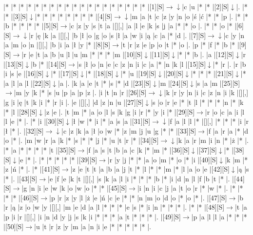 \documentclass[11pt]{article}
\newcommand\drarr{$\rightarrow \!\!\!\!\! \downarrow$}
\newcommand\rarr{$\rightarrow$}
\newcommand\darr{$\downarrow$}
\begin{document}
\noindent\begin{Puzzle}{24}{23}|*	|*	|*	|*	|*	|*	|*	|*	|*	|*	|*	|*	|*	|*	|*	|*	|*	|*	|*	|[1][S]\drarr	|c	|u	|*	|*	|[2][S]\darr	|.
|*	|*	|[3][S]\darr	|*	|*	|*	|*	|*	|*	|*	|*	|[4][S]\drarr	|m	|a	|t	|c	|z	|y	|n	|o	|ś	|ć	|*	|*	|p	|.
|*	|*	|b	|*	|*	|*	|*	|[5][S]\rarr	|c	|z	|y	|s	|t	|a	|[][,]{ }	|a	|l	|e	|k	|s	|j	|a	|*	|*	|o	|.
|*	|*	|o	|*	|[6][S]\drarr	|r	|ę	|k	|a	|[][,]{ }	|b	|ł	|o	|g	|o	|s	|ł	|a	|w	|i	|ą	|c	|a	|*	|d	|.
|[7][S]\drarr	|c	|y	|n	|a	|m	|o	|n	|[][,]{ }	|b	|i	|a	|ł	|y	|*	|[8][S]\rarr	|t	|r	|z	|e	|p	|o	|t	|*	|o	|.
|p	|*	|f	|*	|b	|*	|[9][S]\rarr	|r	|e	|t	|a	|b	|u	|l	|u	|m	|*	|*	|*	|m	|[10][S]\darr	|[11][S]\darr	|*	|*	|b	|.
|a	|[12][S]\darr	|r	|[13][S]\darr	|b	|*	|[14][S]\rarr	|s	|ł	|o	|n	|e	|c	|z	|n	|i	|c	|a	|*	|n	|k	|l	|[15][S]\darr	|*	|r	|.
|r	|b	|i	|s	|e	|[16][S]\darr	|*	|[17][S]\darr	|*	|[18][S]\darr	|*	|u	|[19][S]\darr	|[20][S]\darr	|*	|*	|*	|[21][S]\darr	|*	|a	|l	|a	|l	|[22][S]\darr	|a	|.
|k	|a	|e	|t	|*	|s	|*	|d	|[23][S]\darr	|m	|[24][S]\darr	|s	|a	|m	|[25][S]\rarr	|m	|y	|k	|*	|s	|u	|p	|a	|p	|z	|.
|i	|t	|n	|r	|[26][S]\drarr	|k	|r	|y	|n	|i	|c	|z	|n	|i	|k	|[][,]{ }	|g	|i	|ę	|t	|k	|i	|*	|r	|i	|.
|e	|[][,]{ }	|d	|z	|n	|u	|[27][S]\darr	|s	|o	|r	|e	|*	|t	|l	|*	|*	|*	|n	|*	|k	|*	|l	|[28][S]\darr	|z	|e	|.
|t	|m	|*	|a	|o	|l	|s	|k	|g	|i	|r	|*	|y	|i	|*	|[29][S]\rarr	|r	|o	|c	|a	|i	|l	|l	|e	|*	|.
|*	|i	|[30][S]\darr	|ł	|w	|*	|i	|*	|a	|s	|a	|[31][S]\drarr	|f	|a	|l	|l	|*	|[][,]{ }	|*	|*	|*	|i	|r	|ł	|*	|.
|[32][S]\drarr	|c	|z	|k	|a	|ł	|o	|w	|*	|z	|m	|j	|u	|g	|*	|*	|[33][S]\rarr	|f	|a	|r	|a	|*	|d	|o	|*	|.
|m	|w	|r	|a	|k	|*	|s	|*	|*	|j	|*	|u	|t	|r	|*	|[34][S]\drarr	|k	|a	|r	|m	|i	|n	|*	|ż	|*	|.
|*	|a	|*	|*	|*	|*	|t	|[35][S]\rarr	|f	|a	|s	|t	|b	|a	|c	|k	|*	|m	|*	|[36][S]\darr	|[37][S]\darr	|*	|[38][S]\darr	|e	|*	|.
|*	|*	|*	|*	|*	|[39][S]\rarr	|r	|y	|j	|*	|*	|a	|o	|m	|*	|o	|*	|i	|[40][S]\darr	|k	|m	|*	|z	|ń	|*	|.
|*	|[41][S]\rarr	|z	|e	|t	|t	|a	|b	|a	|j	|t	|*	|l	|*	|*	|m	|*	|l	|a	|o	|e	|[42][S]\darr	|ą	|s	|*	|.
|[43][S]\rarr	|e	|f	|e	|k	|t	|[][,]{ }	|s	|k	|a	|l	|i	|*	|*	|*	|b	|*	|i	|d	|n	|l	|f	|b	|t	|*	|.
|[44][S]\rarr	|g	|n	|i	|e	|w	|k	|o	|w	|o	|*	|*	|[45][S]\rarr	|i	|n	|i	|c	|j	|a	|t	|o	|r	|*	|w	|*	|.
|*	|*	|*	|*	|[46][S]\rarr	|p	|r	|z	|y	|l	|ż	|e	|ń	|c	|e	|*	|*	|n	|m	|o	|d	|o	|*	|o	|*	|.
|[47][S]\rarr	|b	|r	|ą	|z	|o	|w	|y	|[][,]{ }	|m	|e	|d	|a	|l	|*	|*	|*	|e	|s	|*	|i	|n	|*	|*	|*	|.
|*	|*	|[48][S]\rarr	|t	|a	|p	|i	|r	|[][,]{ }	|i	|n	|d	|y	|j	|s	|k	|i	|*	|*	|*	|a	|t	|*	|*	|*	|.
|[49][S]\rarr	|p	|a	|l	|l	|a	|*	|*	|*	|[50][S]\rarr	|u	|t	|r	|z	|y	|m	|a	|n	|i	|e	|*	|*	|*	|*	|*	|.\end{Puzzle}
\end{document}
